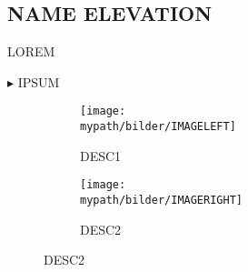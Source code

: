 \subsection{NAME \small{ELEVATION}}
\def \mydate    {Di, 05.01.2016}
\def \mypath    {skitouren/PATHNAME-05.01.2016}
\def \myregion  {Allgäu - Kleinwalsertal}
\def \myparking {ifen.p}
\def \myseason  {Winter 2016}

\def \headersize {0.54}
\def \rating     {$\bigstar~\bigstar~\bigstar~\star$}
\def \ascent     {709}
\def \distance   {6.5}
\def \LLB        {2}
\def \starttime  {12.20}
\def \movingtime {01:41}
\def \overalltime{02:54}
\def \summittime {02:00}
\def \comrades   {-}
\def \difficulty {$L$/1.3/Ex1}
\def \startpoint {\framebox{P} Ifenbahn (3€)}

\def \mapsize{0.5}
\def \mapwrap{16}

\def \myhtx{14}
\def \myhty{-128}

\def \sideimagewith{0.34}
\def \bottomimageleft{0.47}
\def \bottomimageright{0.47}



LOREM


\noindent$\blacktriangleright$
IPSUM

\hfill
\vspace{-3em}
\begin{figure}[b!]
	\begin{subfigure}[b]{\bottomimageleft\textwidth}
		\texttt{[image: \\mypath/bilder/IMAGELEFT]}
		\caption{DESC1}
		\vspace{-2em}
	\end{subfigure}
	\hfill
	\begin{subfigure}[b]{\bottomimageright\textwidth}
		\texttt{[image: \\mypath/bilder/IMAGERIGHT]}
		\caption{DESC2}
		\vspace{-2em}
	\end{subfigure}
\end{figure}
